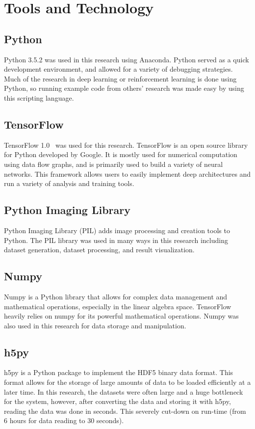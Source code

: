 \documentclass[12pt,american]{report}
\begin{document}
\section{Tools and Technology}
\subsection{Python}
Python 3.5.2 was used in this research using Anaconda.  Python served as a quick development environment, and allowed for a variety of debugging strategies.  Much of the research in deep learning or reinforcement learning is done using Python, so running example code from others' research was made easy by using this scripting language.
\subsection{TensorFlow}
TensorFlow 1.0~\cite{tensorflow2015-whitepaper} was used for this research.  TensorFlow is an open source library for Python developed by Google.  It is mostly used for numerical computation using data flow graphs, and is primarily used to build a variety of neural networks.  This framework allows users to easily implement deep architectures and run a variety of analysis and training tools.  
\subsection{Python Imaging Library}
Python Imaging Library (PIL) adds image processing and creation tools to Python. The PIL library was used in many ways in this research including dataset generation, dataset processing, and result visualization.
\subsection{Numpy}
Numpy is a Python library that allows for complex data management and mathematical operations, especially in the linear algebra space.  TensorFlow heavily relies on numpy for its powerful mathematical operations.  Numpy was also used in this research for data storage and manipulation. 
\subsection{h5py}
h5py is a Python package to implement the HDF5 binary data format.  This format allows for the storage of large amounts of data to be loaded efficiently at a later time.  In this research, the datasets were often large and a huge bottleneck for the system, however, after converting the data and storing it with h5py, reading the data was done in seconds.  This severely cut-down on run-time (from 6 hours for data reading to 30 seconds). 
\end{document}
